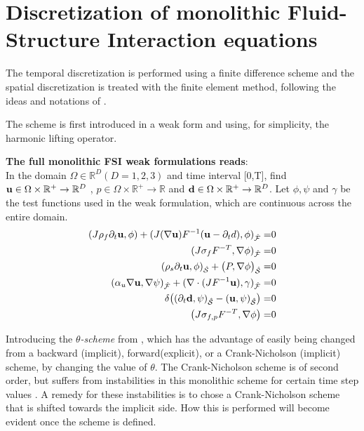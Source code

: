 \section{Discretization of monolithic Fluid-Structure Interaction equations}\label{Discretization}
The temporal discretization is performed using a finite difference scheme and the spatial discretization is treated with the finite element method, following the ideas and notations of \cite{Wick2011}.

The scheme is first introduced in a weak form and using, for simplicity, the harmonic lifting operator. 

\textbf{The full monolithic FSI weak formulations reads}:\\
In the domain $\Omega \in \mathbb{R}^D (D=1,2,3)$ and time interval [0,T],
find $\bold{u} \in \Omega \times \mathbb{R}^+ \rightarrow \mathbb{R}^D$ , $ p \in \Omega \times \mathbb{R}^+ \rightarrow \mathbb{R}$ and $\bold{d} \in \Omega \times \mathbb{R}^+ \rightarrow \mathbb{R}^D$. Let $\phi, \psi$ and $\gamma$ be the test functions used in the weak formulation, which are continuous across the entire domain.
\begin{align}
   (J \rho_f \partial_t \bold{u} , \phi ) + (J (\nabla \bold{u})F^{-1}(\bold{u} - \partial_t d) , \phi )_{\mathcal{\hat{F}}} =& 0 \label{eq:firsweak} \\
   ( J \sigma_{f} F^{-T} , \nabla \phi )_{\mathcal{\hat{F}}} =& 0\\
   (\rho_s \partial_t \bold{u} , \phi)_{\mathcal{\hat{S}}}   + \big(P, \nabla \phi \big)_{\mathcal{\hat{S}}} =& 0\\
   ( \alpha_u \nabla \bold{u}, \nabla \psi)_{\mathcal{\hat{F}}} + (\nabla \cdot (J F^{-1} \bold{u}),\gamma )_{\mathcal{\hat{F}}} =& 0\\
    \delta\big((\partial_t \bold{d} , \psi)_{\mathcal{\hat{S}}}  - ( \bold{u} , \psi )_{\mathcal{\hat{S}}}\big)=&0       \label{eq:condition} \\ 
    \big( J \sigma_{f,p} F^{-T}, \nabla \phi  \big) =& 0 \label{eq:weak} 	 		
\end{align}

Introducing the \textit{$\theta$-scheme} from \cite{Wick2011}, which has the advantage of easily being changed from a backward (implicit), forward(explicit), or a Crank-Nicholson (implicit) scheme, by changing the value of $\theta$. The Crank-Nicholson scheme is of second order, but suffers from instabilities in this monolithic scheme for certain time step values \cite{Wick2011}. A remedy for these instabilities is to chose a Crank-Nicholson scheme that is shifted towards the implicit side. How this is performed will become evident once the scheme is defined.

